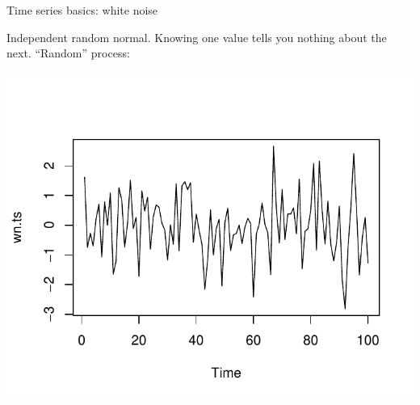 \begin{frame}[fragile]{Time series basics: white noise}
  
Independent random normal. Knowing one value tells you nothing about
the next.  ``Random'' process:



{\small
\begin{knitrout}
\color{fgcolor}\begin{kframe}
\begin{alltt}
\hlkwb{=}\hlstd{(}\hlstd{)}
\hlkwb{=}
\end{alltt}
\end{kframe}
\includegraphics[width=\maxwidth]{figure/ternana-1} 

\end{knitrout}
}
  
  
\end{frame}

